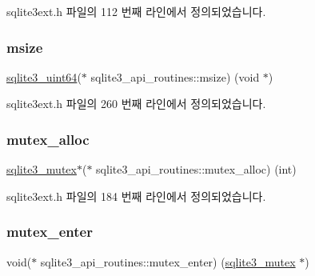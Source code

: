 sqlite3ext.\+h 파일의 112 번째 라인에서 정의되었습니다.

\mbox{\label{structsqlite3__api__routines_a9cee16233cf2f31c23dbda654b1fdfc1}} 
\subsubsection{\texorpdfstring{msize}{msize}}
{\footnotesize\ttfamily \hyperlink{sqlite3_8h_a181c20ecfd72bc6627635746d382c610}{sqlite3\+\_\+uint64}($\ast$ sqlite3\+\_\+api\+\_\+routines\+::msize) (void $\ast$)}



sqlite3ext.\+h 파일의 260 번째 라인에서 정의되었습니다.

\mbox{\label{structsqlite3__api__routines_aafca5fdf6433287ca14458b3c495d342}} 
\subsubsection{\texorpdfstring{mutex\+\_\+alloc}{mutex\_alloc}}
{\footnotesize\ttfamily \hyperlink{sqlite3_8h_a0f546860bde03fddb33a9fed920da05c}{sqlite3\+\_\+mutex}$\ast$($\ast$ sqlite3\+\_\+api\+\_\+routines\+::mutex\+\_\+alloc) (int)}



sqlite3ext.\+h 파일의 184 번째 라인에서 정의되었습니다.

\mbox{\label{structsqlite3__api__routines_afbf4a8e88080839fccf5dcd63ea2cee4}} 
\subsubsection{\texorpdfstring{mutex\+\_\+enter}{mutex\_enter}}
{\footnotesize\ttfamily void($\ast$ sqlite3\+\_\+api\+\_\+routines\+::mutex\+\_\+enter) (\hyperlink{sqlite3_8h_a0f546860bde03fddb33a9fed920da05c}{sqlite3\+\_\+mutex} $\ast$)}



